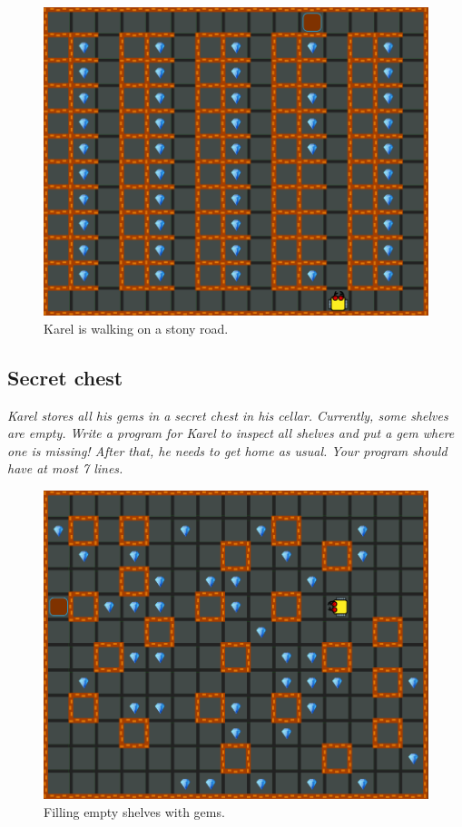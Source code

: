 \begin{figure}[!ht]
\begin{center}
\includegraphics[height=0.4\textwidth]{img/d02.png}
\end{center}
\vspace{-4mm}
\caption{Karel is walking on a stony road.}
\label{fig:d02}
\vspace{-12mm}
\end{figure}
\newpage


\subsection{Secret chest}

{\em Karel stores all his gems in a secret chest in his cellar. 
Currently, some shelves are empty. Write a program for Karel to 
inspect all shelves and put a gem where one is missing! After that, he needs to get 
home as usual. Your program should have at most 7 lines.}\\[-7mm]

\begin{figure}[!ht]
\begin{center}
\includegraphics[height=0.4\textwidth]{img/d03.png}
\end{center}
\vspace{-4mm}
\caption{Filling empty shelves with gems.}
\label{fig:d03}
\vspace{-10mm}
\end{figure}


